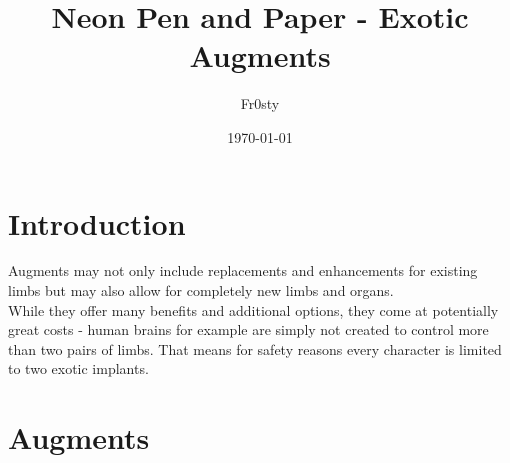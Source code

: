 \documentclass[12pt,a4paper,openany]{book}
\title{Neon Pen and Paper - Exotic Augments}
\author{Fr0sty}
\date{\today}
\begin{document}
    \maketitle
    \tableofcontents

    \chapter{Introduction}
    Augments may not only include replacements and enhancements for existing limbs but may also allow for completely new limbs and organs.\\
    While they offer many benefits and additional options, they come at potentially great costs - human brains for example are simply not created to control more than two pairs of limbs. That means for safety reasons every character is limited to two exotic implants.

    \chapter{Augments}
\end{document}
